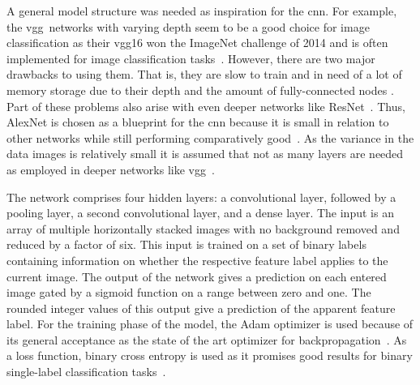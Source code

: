 A general model structure was needed as inspiration for the \acrshort{cnn}. For example, the \acrfull{vgg}~networks with varying depth seem to be a good choice for image classification as their \acrshort{vgg}16 won the ImageNet challenge of 2014 and is often implemented for image classification tasks~\citep{hassan2018vgg,vgg2014original}. However, there are two major drawbacks to using them. That is, they are slow to train and in need of a lot of memory storage due to their depth and the amount of fully-connected nodes \citep{hassan2018vgg,zhang2015accelerating}. Part of these problems also arise with even deeper networks like ResNet~\citep{resnet2016original,hassan2019resnet}. Thus, AlexNet is chosen as a blueprint for the \acrshort{cnn} because it is small in relation to other networks while still performing comparatively good~\citep{hassan2019alexnet,alexnet2012original,geron2019hands}. As the variance in the data images is relatively small it is assumed that not as many layers are needed as employed in deeper networks like \acrshort{vgg}~\citep{geron2019hands}.
 
\bigskip
The network comprises four hidden layers: a convolutional layer, followed by a pooling layer, a second convolutional layer, and a dense layer. The input is an array of multiple horizontally stacked images with no background removed and reduced by a factor of six. This input is trained on a set of binary labels containing information on whether the respective feature label applies to the current image. The output of the network gives a prediction on each entered image gated by a sigmoid function on a range between zero and one. The rounded integer values of this output give a prediction of the apparent feature label.
For the training phase of the model, the Adam optimizer is used because of its general acceptance as the state of the art optimizer for backpropagation~\citep{bushaev2018adam,kingma2014adam}. As a loss function, binary cross entropy is used as it promises good results for binary single-label classification tasks~\citep{geron2019hands,godoy2018understanding,dertat2017applied}.
 
